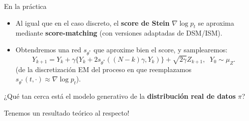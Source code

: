 \documentclass[aspectratio=169,xcolor=dvipsnames, t, spanish]{beamer}
\begin{document}
    \begin{frame}{En la práctica}
        \begin{itemize}
            \item Al igual que en el caso discreto, el \textbf{score de Stein} $\nabla \log p_{t}$ se aproxima mediante \textbf{score-matching} (con versiones adaptadas de DSM/ISM).
            \pause
            \item Obtendremos una red $s_{\theta^{*}}$ que aproxime bien el score, y samplearemos:
            \[ Y_{k+1}=Y_{k}+\gamma\{Y_{k}+2s_{\theta^{*}}((N-k)\gamma,Y_{k})\}+\sqrt{2\gamma}Z_{k+1},\;\; Y_{0}\sim \mu_Z. \]
            (de la discretización EM del proceso en que reemplazamos $s_{\theta^{*}}(t, \cdot) \approx \nabla \log p_{t}$).
        \end{itemize}
        \pause
        \begin{center}
                    ¿Qué tan cerca está el modelo generativo de la \textbf{distribución real de datos} $\pi$?
    
                    Tenemos un resultado teórico al respecto!
        \end{center}
    \end{frame}
    
\end{document}
